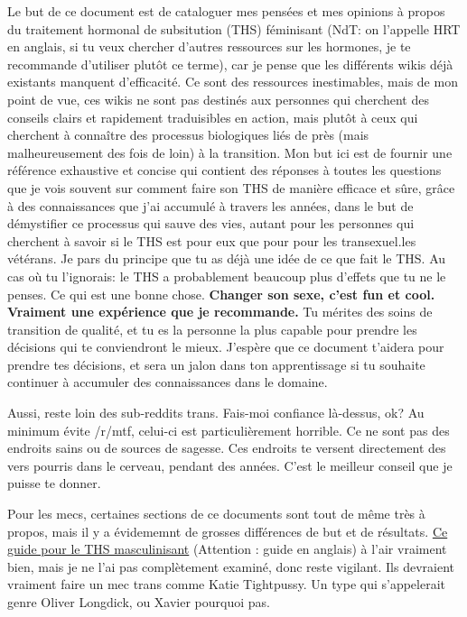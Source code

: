 \documentclass{article}
\begin{document}
Le but de ce document est de cataloguer mes pensées et mes opinions à propos du traitement hormonal de subsitution (THS) féminisant (NdT: on l'appelle HRT en anglais, si tu veux chercher d'autres ressources sur les hormones, je te recommande d'utiliser plutôt ce terme), car je pense que les différents wikis déjà existants manquent d'efficacité. Ce sont des ressources inestimables, mais de mon point de vue, ces wikis ne sont pas destinés aux personnes qui cherchent des conseils clairs et rapidement traduisibles en action, mais plutôt à ceux qui cherchent à connaître des processus biologiques liés de près (mais malheureusement des fois de loin) à la transition. Mon but ici est de fournir une référence exhaustive et concise qui contient des réponses à toutes les questions que je vois souvent sur comment faire son THS de manière efficace et sûre, grâce à des connaissances que j'ai accumulé à travers les années, dans le but de démystifier ce processus qui sauve des vies, autant pour les personnes qui cherchent à savoir si le THS est pour eux que pour pour les transexuel.les vétérans. Je pars du principe que tu as déjà une idée de ce que fait le THS. Au cas où tu l'ignorais: le THS a probablement beaucoup plus d'effets que tu ne le penses. Ce qui est une bonne chose. \textbf{Changer son sexe, c'est fun et cool. Vraiment une expérience que je recommande.} Tu mérites des soins de transition de qualité, et tu es la personne la plus capable pour prendre les décisions qui te conviendront le mieux. J'espère que ce document t'aidera pour prendre tes décisions, et sera un jalon dans ton apprentissage si tu souhaite continuer à accumuler des connaissances dans le domaine.

Aussi, reste loin des sub-reddits trans. Fais-moi confiance là-dessus, ok? Au minimum évite /r/mtf, celui-ci est particulièrement horrible. Ce ne sont pas des endroits sains ou de sources de sagesse. Ces endroits te versent directement des vers pourris dans le cerveau, pendant des années. C'est le meilleur conseil que je puisse te donner.

Pour les mecs, certaines sections de ce documents sont tout de même très à propos, mais il y a évidememnt de grosses différences de but et de résultats. \href{https://mega.nz/folder/cfwSmBbY#ify6kaueB8SdDD1v12t2Dw}{Ce guide pour le THS masculinisant} (Attention : guide en anglais) à l'air vraiment bien, mais je ne l'ai pas complètement examiné, donc reste vigilant. Ils devraient vraiment faire un mec trans comme Katie Tightpussy. Un type qui s'appelerait genre Oliver Longdick, ou Xavier pourquoi pas. 
\end{document}
